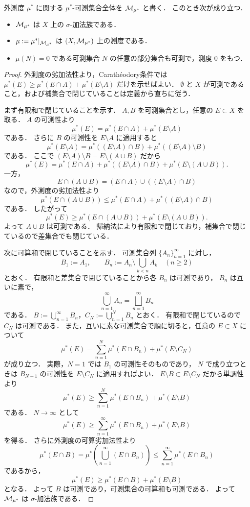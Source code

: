 \begin{theorem}[Carathéodoryの定理]\label{thm:caratheodory-theorem}
外測度 $\mu^*$ に関する $\mu^*$-可測集合全体を $\mathcal M_{\mu^*}$ と書く．
このとき次が成り立つ．
\begin{itemize}
    \item $\mathcal M_{\mu^*}$ は $X$ 上の $\sigma$-加法族である．
    \item $\mu:=\mu^*|_{\mathcal M_{\mu^*}}$ は $(X,\mathcal M_{\mu^*})$ 上の測度である．
    \item $\mu(N)=0$ である可測集合 $N$ の任意の部分集合も可測で，測度 $0$ をもつ．
\end{itemize}
\end{theorem}
\begin{proof}
外測度の劣加法性より，Carathéodory条件では
$\mu^*(E)\ge\mu^*(E\cap A)+\mu^*(E\setminus A)$ だけを示せばよい．
$\emptyset$ と $X$ が可測であること，および補集合で閉じていることは定義から直ちに従う．

まず有限和で閉じていることを示す．
$A,B$ を可測集合とし，任意の $E\subset X$ を取る．
$A$ の可測性より
\[
\mu^*(E)
=
\mu^*(E\cap A)+\mu^*(E\setminus A)
\]
である．
さらに $B$ の可測性を $E\setminus A$ に適用すると
\[
\mu^*(E\setminus A)
=
\mu^*((E\setminus A)\cap B)
+
\mu^*((E\setminus A)\setminus B)
\]
である．
ここで $(E\setminus A)\setminus B=E\setminus(A\cup B)$ だから
\[
\mu^*(E)
=
\mu^*(E\cap A)
+
\mu^*((E\setminus A)\cap B)
+
\mu^*(E\setminus(A\cup B)).
\]
一方，
\[
E\cap(A\cup B)
=
(E\cap A)\cup((E\setminus A)\cap B)
\]
なので，外測度の劣加法性より
\[
\mu^*(E\cap(A\cup B))
\le
\mu^*(E\cap A)+\mu^*((E\setminus A)\cap B)
\]
である．
したがって
\[
\mu^*(E)
\ge
\mu^*(E\cap(A\cup B))+\mu^*(E\setminus(A\cup B)).
\]
よって $A\cup B$ は可測である．
帰納法により有限和で閉じており，補集合で閉じているので差集合でも閉じている．

次に可算和で閉じていることを示す．
可測集合列 $\{A_n\}_{n=1}^{\infty}$ に対し，
\[
B_1:=A_1,\qquad
B_n:=A_n\setminus\bigcup_{k<n}A_k\quad(n\ge2)
\]
とおく．
有限和と差集合で閉じていることから各 $B_n$ は可測であり，
$B_n$ は互いに素で，
\[
\bigcup_{n=1}^{\infty}A_n=\bigsqcup_{n=1}^{\infty}B_n
\]
である．
$B:=\bigcup_{n=1}^{\infty}B_n$，$C_N:=\bigcup_{n=1}^{N}B_n$ とおく．
有限和で閉じているので $C_N$ は可測である．
また，互いに素な可測集合で順に切ると，任意の $E\subset X$ について
\[
\mu^*(E)
=
\sum_{n=1}^{N}\mu^*(E\cap B_n)
+
\mu^*(E\setminus C_N)
\]
が成り立つ．
実際，$N=1$ では $B_1$ の可測性そのものであり，
$N$ で成り立つときは $B_{N+1}$ の可測性を $E\setminus C_N$ に適用すればよい．
$E\setminus B\subset E\setminus C_N$ だから単調性より
\[
\mu^*(E)
\ge
\sum_{n=1}^{N}\mu^*(E\cap B_n)
+
\mu^*(E\setminus B)
\]
である．
$N\to\infty$ として
\[
\mu^*(E)
\ge
\sum_{n=1}^{\infty}\mu^*(E\cap B_n)
+
\mu^*(E\setminus B)
\]
を得る．
さらに外測度の可算劣加法性より
\[
\mu^*(E\cap B)
=
\mu^*\left(\bigcup_{n=1}^{\infty}(E\cap B_n)\right)
\le
\sum_{n=1}^{\infty}\mu^*(E\cap B_n)
\]
であるから，
\[
\mu^*(E)
\ge
\mu^*(E\cap B)+\mu^*(E\setminus B)
\]
となる．
よって $B$ は可測であり，可測集合の可算和も可測である．
よって $\mathcal M_{\mu^*}$ は $\sigma$-加法族である．


\end{proof}
